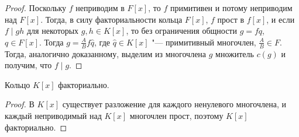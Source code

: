 \begin{proof}
	Поскольку $f$ неприводим в $F[x]$, то $f$ примитивен и потому неприводим над $F[x]$. Тогда, в силу факториальности кольца $F[x]$, $f$ прост в $f[x]$, и если $f \mid gh$ для некоторых $g, h \in K[x]$, то без ограничения общности $g = fq$, $q \in F[x]$. Тогда $g = \frac{A}{B}f\widehat{q}$, где $\widehat{q} \in K[x]$ "--- примитивный многочлен, $\frac{A}{B} \in F$. Тогда, аналогично доказанному, выделим из многочлена $g$ множитель $c(g)$ и получим, что $f \mid g$.
\end{proof}

\begin{theorem}
	Кольцо $K[x]$ факториально.
\end{theorem}

\begin{proof}
	В $K[x]$ существует разложение для каждого ненулевого многочлена, и каждый неприводимый над $K[x]$ многочлен прост, поэтому $K[x]$ факториально.
\end{proof}